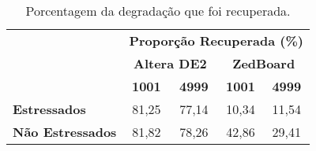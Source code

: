 \begin{table}[H]
\centering
\caption{Porcentagem da degradação que foi recuperada.}
\begin{tabular}{l|cccc|}
\cline{2-5}
 & \multicolumn{4}{c|}{\textbf{Proporção Recuperada (\%)}} \\ \cline{2-5} 
 & \multicolumn{2}{c|}{\textbf{Altera DE2}} & \multicolumn{2}{c|}{\textbf{ZedBoard}} \\ \cline{2-5} 
 & \multicolumn{1}{c|}{\textbf{1001}} & \multicolumn{1}{c|}{\textbf{4999}} & \multicolumn{1}{c|}{\textbf{1001}} & \textbf{4999} \\ \hline
\multicolumn{1}{|l|}{\textbf{Estressados}} & \multicolumn{1}{c|}{81,25} & \multicolumn{1}{c|}{77,14} & \multicolumn{1}{c|}{10,34} & 11,54 \\ \hline
\multicolumn{1}{|l|}{\textbf{Não Estressados}} & \multicolumn{1}{c|}{81,82} & \multicolumn{1}{c|}{78,26} & \multicolumn{1}{c|}{42,86} & 29,41 \\ \hline
\end{tabular}
\label{tab:RelaxProp}
\end{table}